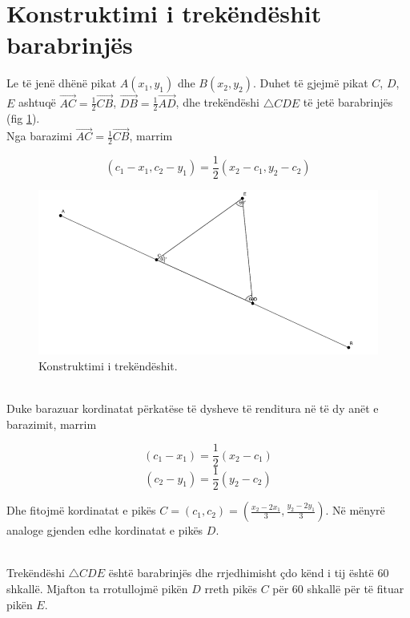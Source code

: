 \section{Konstruktimi i trekëndëshit barabrinjës}

\noindent Le të jenë dhënë pikat \( A(x_1, y_1) \) dhe \( B(x_2, y_2) \). Duhet të gjejmë pikat \( C \), \( D \), \( E \) ashtuqë 
\( \overrightarrow{AC} = \frac{1}{2} \overrightarrow{CB} \), \( \overrightarrow{DB}=\frac{1}{2}\overrightarrow{AD}\), dhe trekëndëshi \( \triangle CDE \) të jetë barabrinjës (fig \ref{fig:koch_construction}). \\

\noindent Nga barazimi \( \overrightarrow{AC} = \frac{1}{2} \overrightarrow{CB} \), marrim

\[ 
\left( c_1 - x_1, c_2 - y_1 \right) = \frac{1}{2} \left( x_2 - c_1, y_2 - c_2 \right) 
\]

\begin{figure}
    \centering
    \includegraphics[width=1\linewidth]{koch_5.png}
    \caption{Konstruktimi i trekëndëshit.}
    \label{fig:koch_construction}
\end{figure}

\noindent \\ Duke barazuar kordinatat përkatëse të dysheve të renditura në të dy anët e barazimit, marrim

\[
(c_1 - x_1) = \frac{1}{2} (x_2 - c_1)
\]
\[
(c_2 - y_1) = \frac{1}{2} (y_2 - c_2)
\]

\noindent Dhe fitojmë kordinatat e pikës \( C = (c_1, c_2) = \left( \frac{x_2 - 2x_1}{3}, \frac{y_2 - 2y_1}{3} \right) \). Në mënyrë analoge gjenden edhe kordinatat e pikës \( D \).

\noindent \\ Trekëndëshi \( \triangle CDE \) është barabrinjës dhe rrjedhimisht çdo kënd i tij është 60 shkallë. Mjafton ta rrotullojmë pikën \( D \) rreth pikës \( C \) për 60 shkallë për të fituar pikën \( E \). 

